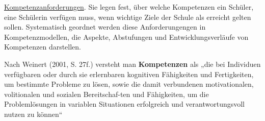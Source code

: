 \documentclass[
12pt,
english,
ngerman,
headsepline,
twoside,
openright,
numbers=noenddot,version=first
]{scrreprt}
\begin{document}







\underline{Kompetenzanforderungen}. Sie legen fest, über welche Kompetenzen ein Schüler, eine Schülerin verfügen muss, wenn wichtige Ziele der Schule als erreicht gelten sollen. Systematisch geordnet werden diese Anforderungengen in Kompetenzmodellen, die Aspekte, Abstufungen und Entwicklungsverläufe von Kompetenzen darstellen.

Nach Weinert (2001, S. 27f.) versteht man \textbf{Kompetenzen} als „die bei Individuen verfügbaren oder durch sie erlernbaren kognitiven Fähigkeiten und Fertigkeiten, um bestimmte Probleme zu lösen, sowie die damit verbundenen motivationalen, volitionalen und sozialen Bereitschaf-ten und Fähigkeiten, um die Problemlösungen in variablen Situationen erfolgreich und verantwortungsvoll nutzen zu können“
\end{document}
